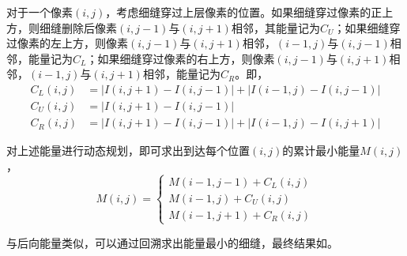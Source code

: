\documentclass[11pt,a4paper]{article}
\begin{document}
对于一个像素$(i,j)$，考虑细缝穿过上层像素的位置。如果细缝穿过像素的正上方，则细缝删除后像素$(i,j-1)$与$(i,j+1)$相邻，其能量记为$C_U$；如果细缝穿过像素的左上方，则像素$(i,j-1)$与$(i,j+1)$相邻，$(i-1,j)$与$(i,j-1)$相邻，能量记为$C_L$；如果细缝穿过像素的右上方，则像素$(i,j-1)$与$(i,j+1)$相邻，$(i-1,j)$与$(i,j+1)$相邻，能量记为$C_R$。即，
\begin{equation}
    \begin{split}
        C_L(i,j) &= |I(i,j+1)-I(i,j-1)| + |I(i-1,j)-I(i,j-1)|\\
        C_U(i,j) &= |I(i,j+1)-I(i,j-1)|\\
        C_R(i,j) &= |I(i,j+1)-I(i,j-1)| + |I(i-1,j)-I(i,j+1)|
    \end{split}
\end{equation}

对上述能量进行动态规划，即可求出到达每个位置$(i,j)$的累计最小能量$M(i,j)$，
\begin{equation}
    M(i,j) = \begin{cases}
        M(i-1,j-1) + C_L(i,j)\\
        M(i-1,j) + C_U(i,j)\\
        M(i-1,j+1) + C_R(i,j)
    \end{cases}
\end{equation}

与后向能量类似，可以通过回溯求出能量最小的细缝，最终结果如。
\end{document}
